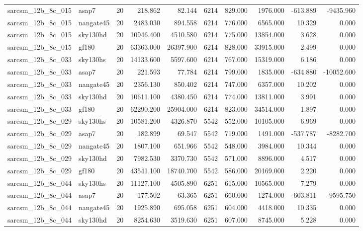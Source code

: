 \begin{longtable}{llrrrrrrrr}
sarcsm\_12b\_8c\_015 & asap7 & 20 & 218.862 & 82.144 & 6214 & 829.000 & 1976.000 & -613.889 & -9435.960 \\
sarcsm\_12b\_8c\_015 & nangate45 & 20 & 2483.030 & 894.558 & 6214 & 776.000 & 6565.000 & 10.329 & 0.000 \\
sarcsm\_12b\_8c\_015 & sky130hd & 20 & 10946.400 & 4510.580 & 6214 & 775.000 & 13854.000 & 3.628 & 0.000 \\
sarcsm\_12b\_8c\_015 & gf180 & 20 & 63363.000 & 26397.900 & 6214 & 828.000 & 33915.000 & 2.499 & 0.000 \\
sarcsm\_12b\_8c\_033 & sky130hs & 20 & 14133.600 & 5597.600 & 6214 & 767.000 & 15319.000 & 6.186 & 0.000 \\
sarcsm\_12b\_8c\_033 & asap7 & 20 & 221.593 & 77.784 & 6214 & 799.000 & 1835.000 & -634.880 & -10052.600 \\
sarcsm\_12b\_8c\_033 & nangate45 & 20 & 2356.130 & 850.402 & 6214 & 747.000 & 6357.000 & 10.202 & 0.000 \\
sarcsm\_12b\_8c\_033 & sky130hd & 20 & 10611.100 & 4380.450 & 6214 & 774.000 & 13811.000 & 3.991 & 0.000 \\
sarcsm\_12b\_8c\_033 & gf180 & 20 & 62290.200 & 25904.000 & 6214 & 823.000 & 34514.000 & 1.897 & 0.000 \\
sarcsm\_12b\_8c\_029 & sky130hs & 20 & 10581.200 & 4326.870 & 5542 & 552.000 & 10105.000 & 6.969 & 0.000 \\
sarcsm\_12b\_8c\_029 & asap7 & 20 & 182.899 & 69.547 & 5542 & 719.000 & 1491.000 & -537.787 & -8282.700 \\
sarcsm\_12b\_8c\_029 & nangate45 & 20 & 1807.100 & 651.966 & 5542 & 548.000 & 3984.000 & 10.344 & 0.000 \\
sarcsm\_12b\_8c\_029 & sky130hd & 20 & 7982.530 & 3370.730 & 5542 & 571.000 & 8896.000 & 4.517 & 0.000 \\
sarcsm\_12b\_8c\_029 & gf180 & 20 & 43541.100 & 18740.700 & 5542 & 586.000 & 20169.000 & 2.220 & 0.000 \\
sarcsm\_12b\_8c\_044 & sky130hs & 20 & 11127.100 & 4505.890 & 6251 & 615.000 & 10565.000 & 7.279 & 0.000 \\
sarcsm\_12b\_8c\_044 & asap7 & 20 & 177.502 & 63.365 & 6251 & 660.000 & 1274.000 & -603.811 & -9595.750 \\
sarcsm\_12b\_8c\_044 & nangate45 & 20 & 1925.890 & 695.058 & 6251 & 604.000 & 4418.000 & 10.335 & 0.000 \\
sarcsm\_12b\_8c\_044 & sky130hd & 20 & 8254.630 & 3519.630 & 6251 & 607.000 & 8745.000 & 5.228 & 0.000 \\

\end{longtable}
